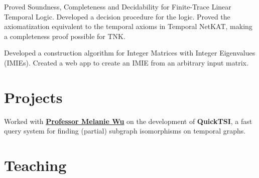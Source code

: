 \documentclass[]{deedy-resume-openfont}
\begin{document}
\begin{minipage}[t]{0.66\textwidth}
Proved Soundness, Completeness and Decidability for Finite-Trace Linear Temporal Logic. Developed a decision procedure for the logic. Proved the axiomatization equivalent to the temporal axioms in Temporal NetKAT, making a completeness proof possible for TNK.
\sectionsep

Developed a construction algorithm for Integer Matrices with Integer Eigenvalues (IMIEs). Created a web app to create an IMIE from an arbitrary input matrix.
\sectionsep




\section{Projects}

Worked with \textbf{\href{http://www.cs.pomona.edu/~mwu/files/bio.htm}{Professor Melanie Wu}} on the development of \textbf{QuickTSI}, a fast query system for finding (partial) subgraph isomorphisms on temporal graphs.
\sectionsep





\section{Teaching} 


\end{minipage}
\end{document}
